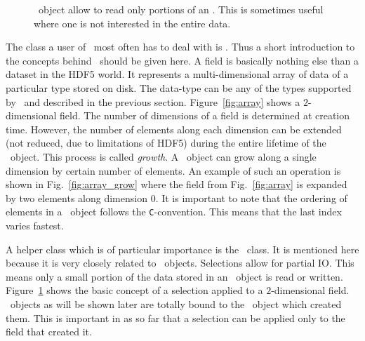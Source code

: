 \begin{figure}[tb]
\begin{minipage}[t]{0.36\linewidth}
\caption{{\small\label{fig:selection}\nxselection\ object allow to read only 
portions of an \nxfield. This is sometimes useful where one is not interested in
the entire data.}}
\end{minipage}
\end{figure}

The class a user of \pninx\ most often has to deal with is \nxfield. 
Thus a short introduction to the concepts behind \nxfield\ should be given here.
A field is basically nothing else than a dataset in the HDF5 world. 
It represents a multi-dimensional array of data of a particular type stored on
disk. The data-type can be any of the types supported by \pninx\ and described
in the previous section. 
Figure~\ref{fig:array} shows a $2$-dimensional field. The number of dimensions
of a field is determined at creation time. However, the number of elements along
each dimension can be extended (not reduced, due to limitations of HDF5) during 
the entire lifetime of the \nxfield\ object. This process is called {\em
growth}. A \nxfield\ object can grow along a single dimension by certain number
of elements. An example of such an operation is shown in
Fig.~\ref{fig:array_grow} where the field from Fig.~\ref{fig:array} is expanded
by two elements along dimension $0$. 
It is important to note that the ordering of elements in a \nxfield\ object
follows the {\tt C}-convention. This means that the last index varies fastest.

A helper class which is of particular importance is the \nxselection\ class. 
It is mentioned here because it is very closely related to \nxfield\ objects.
Selections allow for partial IO. This means only a small portion of the data
stored in an \nxfield\ object is read or written. Figure~\ref{fig:selection}
shows the basic concept of a selection applied to a $2$-dimensional field. 
\nxselection\ objects as will be shown later are totally bound to the \nxfield\
object which created them. This is important in  as so far that a selection can
be applied only to the field that created it.
 

